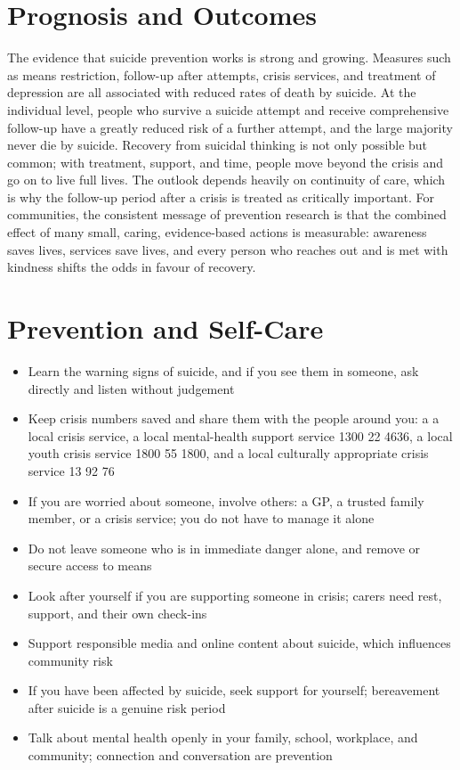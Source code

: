 \section*{Prognosis and Outcomes}
The evidence that suicide prevention works is strong and growing. Measures such as means restriction, follow-up after attempts, crisis services, and treatment of depression are all associated with reduced rates of death by suicide. At the individual level, people who survive a suicide attempt and receive comprehensive follow-up have a greatly reduced risk of a further attempt, and the large majority never die by suicide. Recovery from suicidal thinking is not only possible but common; with treatment, support, and time, people move beyond the crisis and go on to live full lives. The outlook depends heavily on continuity of care, which is why the follow-up period after a crisis is treated as critically important. For communities, the consistent message of prevention research is that the combined effect of many small, caring, evidence-based actions is measurable: awareness saves lives, services save lives, and every person who reaches out and is met with kindness shifts the odds in favour of recovery.

\section*{Prevention and Self-Care}
\begin{itemize}
    \item Learn the warning signs of suicide, and if you see them in someone, ask directly and listen without judgement
    \item Keep crisis numbers saved and share them with the people around you: a a local crisis service, a local mental-health support service 1300 22 4636, a local youth crisis service 1800 55 1800, and a local culturally appropriate crisis service 13 92 76
    \item If you are worried about someone, involve others: a GP, a trusted family member, or a crisis service; you do not have to manage it alone
    \item Do not leave someone who is in immediate danger alone, and remove or secure access to means
    \item Look after yourself if you are supporting someone in crisis; carers need rest, support, and their own check-ins
    \item Support responsible media and online content about suicide, which influences community risk
    \item If you have been affected by suicide, seek support for yourself; bereavement after suicide is a genuine risk period
    \item Talk about mental health openly in your family, school, workplace, and community; connection and conversation are prevention
\end{itemize}

